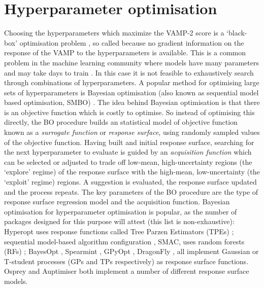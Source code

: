 \section{Hyperparameter optimisation}\label{sec:intro_hyper_opt}
Choosing the hyperparameters which maximize the VAMP-2 score is a `black-box' optimisation problem \cite{jonesEfficientGlobalOptimization1998a}, so called because no gradient information on the response of the VAMP to the hyperparameters is available. This is a common problem in the machine learning community where models have many parameters and may take days to train \cite{feurer2019hyperparameter}. In this case it is not feasible to exhaustively search through combinations of hyperparameters. A popular method for optimising large sets of hyperparameters is Bayesian optimisation (also known as sequential model based optimisation, SMBO)  \cite{hutterSequentialModelbasedOptimization2011} \cite{NIPS2012_4522}\cite{bergstraAlgorithmsHyperParameterOptimizationa} \cite{bergstraMakingScienceModel2013}. The idea behind Bayesian optimisation is  \cite{brochuTutorialBayesianOptimization2010}\cite{shahriariTakingHumanOut2016} that there is an objective function which is costly to optimise. So instead of optimising this directly, the BO procedure builds an statistical model of  objective function known as a \emph{surrogate function} or \emph{response surface}, using randomly sampled  values of the objective function. Having built and initial response surface, searching for the next hyperparameter to evaluate is guided by an \emph{acquisition function} which can be selected or adjusted to trade off low-mean, high-uncertainty regions (the `explore' regime) of the response surface with the high-mean, low-uncertainty (the `exploit' regime) regions. A suggestion is evaluated, the response surface updated and the process repeats. The key parameters of the BO procedure are the type of response surface regression model and the acquisition function. Bayesian optimisation for hyperparameter optimisation is popular, as the number of packages designed for this purpose will attest (this list is non-exhaustive): Hyperopt \cite{bergstraHyperoptPythonLibrary2013} uses response functions called Tree Parzen Estimators (TPEs) \cite{bergstraAlgorithmsHyperParameterOptimization}; sequential model-based algorithm configuration  \cite{hutterSequentialModelbasedOptimization2011}, SMAC, uses random forests (RFs) \cite{breimanRandomForests2001}; BayesOpt \cite{martinez-cantinBayesOptBayesianOptimization2014}, Spearmint \cite{DBLP:conf/uai/GelbartSA14}\cite{snoekAbstractBayesianOptimization2013}\cite{snoekInputWarpingBayesian2014a}\cite{NIPS2013_5086}\cite{NIPS2012_4522}, GPyOpt \cite{gpyopt2016}, DragonFly \cite{JMLR:v21:18-223}, all implement Gaussian or T-student processes  (GPs and TPs respectively) \cite{rasmussenGaussianProcessesMachine2006} as response surface functions. Osprey \cite{mcgibbonOspreyHyperparameterOptimization2016a} and Auptimiser \cite{liuAuptimizerExtensibleOpenSource2019} both implement a number of different response surface models. 

